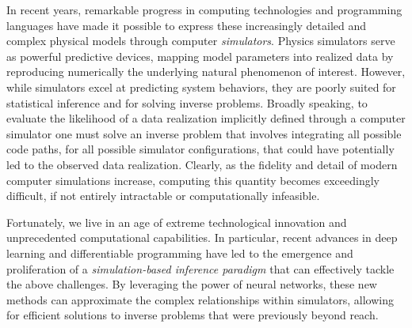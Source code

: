 In recent years, remarkable progress in computing technologies and programming languages have made it possible to express these increasingly detailed and complex physical models through computer \emph{simulators}. Physics simulators serve as powerful predictive devices, mapping model parameters into realized data by reproducing numerically the underlying natural phenomenon of interest. However, while simulators excel at predicting system behaviors, they are poorly suited for statistical inference and for solving inverse problems. 
Broadly speaking, to evaluate the likelihood of a data realization implicitly defined through a computer simulator one must solve an inverse problem that involves integrating all possible code paths, for all possible simulator configurations, that could have potentially led to the observed data realization. Clearly, as the fidelity and detail of modern computer simulations increase, computing this quantity becomes exceedingly difficult, if not entirely intractable or computationally infeasible. 

Fortunately, we live in an age of extreme technological innovation and unprecedented computational capabilities. In particular, recent advances in  deep learning and differentiable programming have led to the emergence and proliferation of a \emph{simulation-based inference paradigm} that can effectively tackle the above challenges. By leveraging the power of neural networks, these new methods can approximate the complex relationships within simulators, allowing for efficient solutions to inverse problems that were previously beyond reach.

